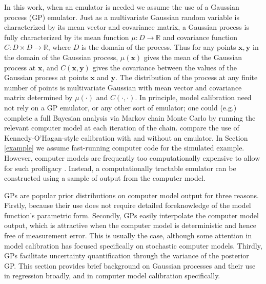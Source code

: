 \documentclass[12pt]{article}
\begin{document}
In this work, when an emulator is needed we assume the use of a Gaussian process (GP) emulator.
%
Just as a multivariate Gaussian random variable is characterized by its mean vector and covariance matrix, a Gaussian process is fully characterized by its mean function $\mu:D\to \mathbb R$ and covariance function $C:D\times D\to \mathbb R$, where $D$ is the domain of the process. 
%
Thus for any points $\mathbf x,\mathbf y$ in the domain of the Gaussian process, $\mu(\mathbf x)$ gives the mean of the Gaussian process at $\mathbf x$, and $C(\mathbf x, \mathbf y)$ gives the covariance between the values of the Gaussian process at points $\mathbf x$ and $\mathbf y$.
%
The distribution of the process at any finite number of points is multivariate Gaussian with mean vector and covariance matrix determined by $\mu(\cdot)$ and $C(\cdot,\cdot)$.
%
In principle, model calibration need not rely on a GP emulator, or any other sort of emulator; one could (e.g.) complete a full Bayesian analysis via Markov chain Monte Carlo \citep[MCMC;][]{Gelfand1990} by running the relevant computer model at each iteration of the chain. 
%
\cite{Hemez2011} compare the use of Kennedy-O'Hagan-style calibration with and without an emulator. 
%
In Section \ref{example} we assume fast-running computer code for the simulated example.
%
However, computer models are frequently too computationally expensive to allow for such profligacy \citep{VanBuren2013,VanBuren2014}.
%
Instead, a computationally tractable emulator can be constructed using a sample of output from the computer model. 
%

GPs are popular prior distributions on computer model output for three reasons.
%
Firstly, because their use does not require detailed foreknowledge of the model function's parametric form. 
%
Secondly, GPs easily interpolate the computer model output, which is attractive when the computer model is deterministic and hence free of measurement error. 
%
This is usually the case, although some attention in model calibration \citep[e.g.,][]{Pratola2018} has focused specifically on stochastic computer models. 
%
Thirdly, GPs facilitate uncertainty quantification through the variance of the posterior GP. 
%
This section provides brief background on Gaussian processes and their use in regression broadly, and in computer model calibration specifically.
%
\end{document}
